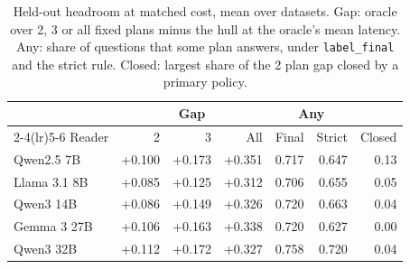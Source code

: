 \begin{table}[t]
\centering\footnotesize
\setlength{\tabcolsep}{2.8pt}
\caption{Held-out headroom at matched cost, mean over datasets. Gap: oracle over 2, 3 or all fixed plans minus the hull at the oracle's mean latency. Any: share of questions that some plan answers, under \texttt{label\_final} and the strict rule. Closed: largest share of the 2 plan gap closed by a primary policy.}
\label{tab:p_headroom}
\begin{tabular*}{\linewidth}{@{\extracolsep{\fill}}lrrrrrr@{}}
\toprule
 & \multicolumn{3}{c}{Gap} & \multicolumn{2}{c}{Any} & \\
\cmidrule(lr){2-4}\cmidrule(lr){5-6}
Reader & 2 & 3 & All & Final & Strict & Closed \\
\midrule
Qwen2.5 7B & +0.100 & +0.173 & +0.351 & 0.717 & 0.647 & 0.13 \\
Llama 3.1 8B & +0.085 & +0.125 & +0.312 & 0.706 & 0.655 & 0.05 \\
Qwen3 14B & +0.086 & +0.149 & +0.326 & 0.720 & 0.663 & 0.04 \\
Gemma 3 27B & +0.106 & +0.163 & +0.338 & 0.720 & 0.627 & 0.00 \\
Qwen3 32B & +0.112 & +0.172 & +0.327 & 0.758 & 0.720 & 0.04 \\
\bottomrule
\end{tabular*}
\end{table}
